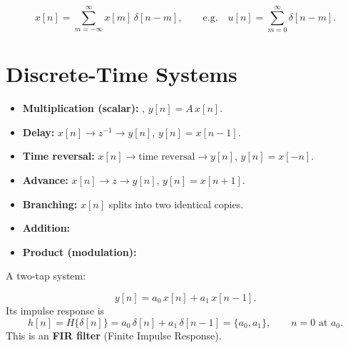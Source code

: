 \documentclass[handout_subfiles_root.tex]{subfiles}
\begin{document}
\begin{factbox}
$$x[n] = \sum_{m=-\infty}^{\infty} x[m]\,\delta[n-m], \qquad
  \text{e.g.}\quad u[n] = \sum_{m=0}^{\infty}\delta[n-m].$$
\end{factbox}

\section{Discrete-Time Systems}

\begin{center}
\end{center}


\begin{itemize}
  \item \textbf{Multiplication (scalar):} \HandoutScalarMultDiagram, \quad
  $y[n] = A\,x[n]$.
  \item \textbf{Delay:} $x[n] \to \boxed{z^{-1}} \to y[n]$, \quad
  $y[n] = x[n-1]$.
  \item \textbf{Time reversal:} $x[n] \to \boxed{\text{time reversal}} \to y[n]$, \quad
  $y[n] = x[-n]$.
  \item \textbf{Advance:} $x[n] \to \boxed{z} \to y[n]$, \quad $y[n] = x[n+1]$.
  \item \textbf{Branching:} \HandoutBranchingDiagram\quad
  $x[n]$ splits into two identical copies.
  \item \textbf{Addition:} \HandoutAdditionDiagram
  \item \textbf{Product (modulation):} \HandoutModulationDiagram
\end{itemize}

\begin{examplebox}[title={Example}]
A two-tap system:
\begin{center}
\HandoutTwoTapFIRDiagram
\end{center}
$$y[n] = a_0\,x[n] + a_1\,x[n-1].$$
Its impulse response is
$$h[n] = H\{\delta[n]\} = a_0\,\delta[n] + a_1\,\delta[n-1] = \{a_0, a_1\},
  \qquad n=0 \text{ at } a_0.$$
This is an \textbf{FIR filter} (Finite Impulse Response).
\end{examplebox}
\end{document}
